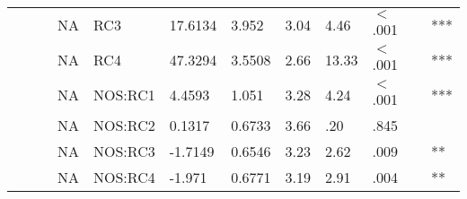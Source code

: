 \begin{table}[ht]
\begin{tabular}{lllllllllll}
   &  &  & NA & RC3 & 17.6134 & 3.952 & 3.04 & 4.46 & $<$.001 & *** \\ 
   &  &  & NA & RC4 & 47.3294 & 3.5508 & 2.66 & 13.33 & $<$.001 & *** \\ 
   &  &  & NA & NOS:RC1 & 4.4593 & 1.051 & 3.28 & 4.24 & $<$.001 & *** \\ 
   &  &  & NA & NOS:RC2 & 0.1317 & 0.6733 & 3.66 & .20 & .845 &   \\ 
   &  &  & NA & NOS:RC3 & -1.7149 & 0.6546 & 3.23 & 2.62 & .009 & ** \\ 
   &  &  & NA & NOS:RC4 & -1.971 & 0.6771 & 3.19 & 2.91 & .004 & ** \\ 
   \hline
\end{tabular}
\endgroup
\end{table}
